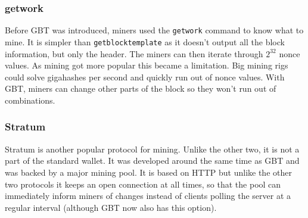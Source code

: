 \subsubsection{getwork}

Before GBT was introduced, miners used the \texttt{getwork} command to know what to mine. It is simpler than \texttt{getblocktemplate} as it doesn't output all the block information, but only the header. The miners can then iterate through $2^{32}$ nonce values. As mining got more popular this became a limitation. Big mining rigs could solve gigahashes per second and quickly run out of nonce values. With GBT, miners can change other parts of the block so they won't run out of combinations.

\subsubsection{Stratum}

Stratum is another popular protocol for mining. Unlike the other two, it is not a part of the standard wallet. It was developed around the same time as GBT and was backed by a major mining pool. It is based on HTTP but unlike the other two protocols it keeps an open connection at all times, so that the pool can immediately inform miners of changes instead of clients polling the server at a regular interval (although GBT now also has this option).


\newpage